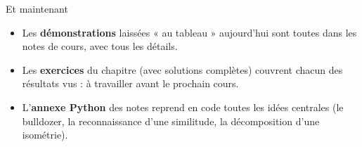 \begin{frame}{Et maintenant}
  \begin{itemize}
    \item Les \textbf{démonstrations} laissées « au tableau »
      aujourd'hui sont toutes dans les notes de cours, avec tous les
      détails.
    \item Les \textbf{exercices} du chapitre (avec solutions
      complètes) couvrent chacun des résultats vus : à travailler
      avant le prochain cours.
    \item L'\textbf{annexe Python} des notes reprend en code toutes
      les idées centrales (le bulldozer, la reconnaissance d'une
      similitude, la décomposition d'une isométrie).
  \end{itemize}
\end{frame}
